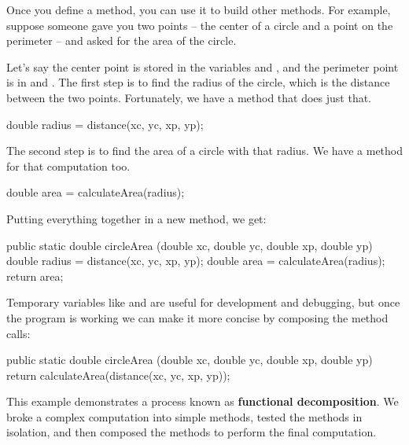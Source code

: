Once you define a method, you can use it to build other methods.
For example, suppose someone gave you two points -- the center of a circle and a point on the perimeter -- and asked for the area of the circle.

Let's say the center point is stored in the variables  and , and the perimeter point is in  and .
The first step is to find the radius of the circle, which is the distance between the two points.
Fortunately, we have a method that does just that.

\begin{code}
double radius = distance(xc, yc, xp, yp);
\end{code}

The second step is to find the area of a circle with that radius.
We have a method for that computation too.

\begin{code}
double area = calculateArea(radius);
\end{code}

Putting everything together in a new method, we get:

\begin{code}
public static double circleArea
        (double xc, double yc, double xp, double yp) {
    double radius = distance(xc, yc, xp, yp);
    double area = calculateArea(radius);
    return area;
}
\end{code}

Temporary variables like  and  are useful for development and debugging, but once the program is working we can make it more concise by composing the method calls:

\begin{code}
public static double circleArea
        (double xc, double yc, double xp, double yp) {
    return calculateArea(distance(xc, yc, xp, yp));
}
\end{code}


This example demonstrates a process known as {\bf functional decomposition}.
We broke a complex computation into simple methods, tested the methods in isolation, and then composed the methods to perform the final computation.



